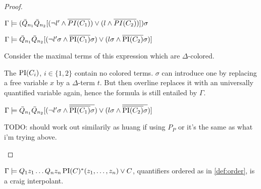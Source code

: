 \documentclass[,%
	paper=a4,%
	DIV14, 
	liststotoc,
	bibtotoc,
	draft=false,%
	numbers=noendperiod
]{scrartcl}
\begin{document}
\begin{proof}
\begin{enumerate}
			$\Gamma \models (\bar Q_{n_1} \bar Q_{n_2} [ (\lnot l' \land  \overline{PI(C_1)}) \lor (l \land \overline{PI(C_2)}) ] ) \sigma$

			$\Gamma \models \bar Q_{n_1} \bar Q_{n_2} [ (\lnot l'\sigma \land  \overline{\operatorname{PI}(C_1)}\sigma) \lor (l\sigma \land \overline{\operatorname{PI}(C_2)}\sigma) ] $

			Consider the maximal terms of this expression which are $\Delta$-colored.

			The $\operatorname{PI}(C_i)$, $i \in \{1,2\}$ contain no colored terms. $\sigma$ can introduce one by replacing a free variable $x$ by a $\Delta$-term $t$. But then overline replaces it with an universally quantified variable again, hence the formula is still entailed by $\Gamma$.

			$\Gamma \models \bar Q_{n_1} \bar Q_{n_2} [ (\lnot l'\sigma \land  \overline{\overline{\operatorname{PI}(C_1)}\sigma}) \lor (l\sigma \land \overline{\overline{\operatorname{PI}(C_2)}\sigma}) ] $



			TODO: should work out similarily as huang if using $P_P$ or it's the same as what i'm trying above.

	\end{enumerate}
\end{proof}



\begin{prop}
	$\Gamma \models Q_1 z_1 \ldots Q_n z_n \operatorname{PI}(C)^*(z_1, \ldots, z_n)  \lor C$, quantifiers ordered as in \ref{def:order}, is a craig interpolant.
\end{prop}
\end{document}
